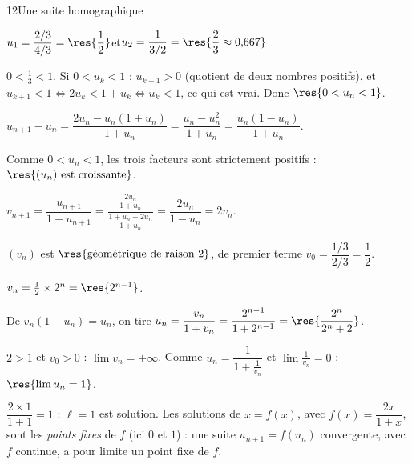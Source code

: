 \begin{corrige}{12}{Une suite homographique}
\begin{questions}
  \item \begin{questions}
      \item $u_1=\dfrac{2/3}{4/3}=\res{\dfrac12}$\quad et\quad $u_2=\dfrac{1}{3/2}=\res{\dfrac23\approx0{,}667}$
      \item {} $0<\frac13<1$.\enspace
         Si $0<u_k<1$ : $u_{k+1}>0$ (quotient de deux nombres positifs), et
        $u_{k+1}<1\iff2u_k<1+u_k\iff u_k<1$, ce qui est vrai. Donc $\res{0<u_n<1}$.
    \end{questions}
  \item \begin{questions}
      \item $u_{n+1}-u_n=\dfrac{2u_n-u_n(1+u_n)}{1+u_n}=\dfrac{u_n-u_n^{2}}{1+u_n}=\dfrac{u_n(1-u_n)}{1+u_n}$.
      \item Comme $0<u_n<1$, les trois facteurs sont strictement positifs : $\res{(u_n)\text{ est croissante}}$.
    \end{questions}
\end{questions}
\begin{questions}[resume]
  \item \begin{questions}
      \item $v_{n+1}=\dfrac{u_{n+1}}{1-u_{n+1}}=\dfrac{\frac{2u_n}{1+u_n}}{\frac{1+u_n-2u_n}{1+u_n}}=\dfrac{2u_n}{1-u_n}=2v_n$.
      \item $(v_n)$ est $\res{\text{géométrique de raison }2}$, de premier terme $v_0=\dfrac{1/3}{2/3}=\dfrac12$.
    \end{questions}
  \item \begin{questions}
      \item $v_n=\frac12\times2^{n}=\res{2^{n-1}}$.
      \item De $v_n(1-u_n)=u_n$, on tire $u_n=\dfrac{v_n}{1+v_n}=\dfrac{2^{n-1}}{1+2^{n-1}}=\res{\dfrac{2^{n}}{2^{n}+2}}$.
    \end{questions}
\end{questions}
\begin{questions}[resume]
  \item $2>1$ et $v_0>0$ : $\lim v_n=+\infty$. Comme $u_n=\dfrac{1}{1+\frac{1}{v_n}}$ et $\lim\frac{1}{v_n}=0$ : $\res{\lim u_n=1}$.
  \item $\dfrac{2\times1}{1+1}=1$ : $\ell=1$ est solution. Les solutions de $x=f(x)$, avec $f(x)=\dfrac{2x}{1+x}$, sont
    les \emph{points fixes} de $f$ (ici $0$ et $1$) : une suite $u_{n+1}=f(u_n)$ convergente, avec $f$ continue,
    a pour limite un point fixe de $f$.
\end{questions}
\end{corrige}

